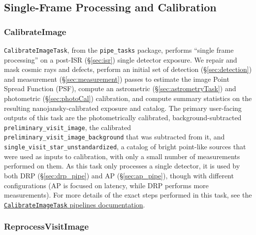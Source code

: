 \subsection{Single-Frame Processing and Calibration}

\subsubsection{CalibrateImage}
\label{sec:CalibrateImage}

\texttt{CalibrateImageTask}, from the \texttt{pipe\_tasks} package, performs ``single frame processing'' on a post-ISR (\S\ref{sec:isr}) single detector exposure.
We repair and mask cosmic rays and defects, perform an initial set of detection (\S\ref{sec:detection}) and measurement (\S\ref{sec:measurement}) passes to estimate the image Point Spread Function (PSF), compute an astrometric (\S\ref{sec:astrometryTask}) and photometric (\S\ref{sec:photoCal}) calibration, and compute summary statistics on the resulting nanojansky-calibrated exposure and catalog.
The primary user-facing outputs of this task are the photometrically calibrated, background-subtracted \texttt{preliminary\_\-visit\_\-image}, the calibrated \texttt{preliminary\_\-visit\_\-image\_\-background} that was subtracted from it, and \texttt{single\_\-visit\_\-star\_\-unstandardized}, a catalog of bright point-like sources that were used as inputs to calibration, with only a small number of measurements performed on them.
As this task only processes a single detector, it is used by both DRP (\S\ref{sec:drp_pipe}) and AP (\S\ref{sec:ap_pipe}), though with different configurations (AP is focused on latency, while DRP performs more measurements).
For more details of the exact steps performed in this task, see the \href{https://pipelines.lsst.io/v/daily/modules/lsst.pipe.tasks/tasks/lsst.pipe.tasks.calibrateImage.CalibrateImageTask.html}{\texttt{Calibrate\-Image\-Task} pipelines documentation}.

\subsubsection{ReprocessVisitImage}
\label{sec:ReprocessVisitImage}

